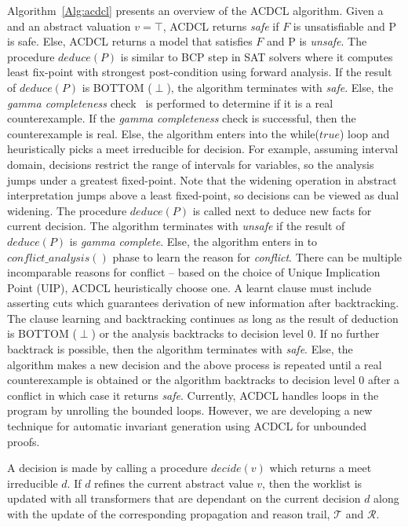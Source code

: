 Algorithm~\ref{Alg:acdcl} presents an overview of the ACDCL algorithm.
Given a  and an abstract valuation $v = \top$,  
ACDCL returns {\em safe} if $F$ is unsatisfiable and P is safe. Else, 
ACDCL returns a model that satisfies $F$ and P is {\em unsafe}.  The 
procedure $deduce(P)$ is similar to BCP step in SAT solvers where 
it computes least fix-point with strongest post-condition using 
forward analysis. If the result of $deduce(P)$ 
is BOTTOM ($\perp$), the algorithm terminates with {\em safe}. Else, the 
{\em gamma completeness} check~\cite{sas01} is performed to determine if it is a 
real counterexample. If the {\em gamma completeness} check is successful, then the 
counterexample is real. Else, the algorithm enters into the while($true$)
loop and heuristically picks a meet irreducible for decision. For example, assuming 
interval domain, decisions restrict the range of intervals for variables, so the analysis jumps under a 
greatest fixed-point. Note that the widening operation in abstract interpretation 
jumps above a least fixed-point, so decisions can be viewed as 
dual widening. The procedure $deduce(P)$ is called next to deduce new facts for 
current decision. The algorithm terminates with {\em unsafe} if the result of $deduce(P)$ 
is {\em gamma complete}. Else, the algorithm enters in to $conflict\_analysis()$ phase to learn 
the reason for {\em conflict}. There can be multiple incomparable reasons for conflict --
based on the choice of Unique Implication Point (UIP), ACDCL heuristically choose one. 
A learnt clause must include asserting cuts which guarantees
derivation of new information after backtracking. The clause learning and backtracking continues 
as long as the result of deduction is BOTTOM ($\perp$) or the 
analysis backtracks to decision level 0. If no further backtrack is possible, then the 
algorithm terminates with {\em safe}. Else, the algorithm makes a new decision and 
the above process is repeated until a real counterexample is obtained or the algorithm 
backtracks to decision level 0 after a conflict in which case it returns {\em safe}. 
Currently, ACDCL handles loops in the program by unrolling the bounded loops. 
However, we are developing a new technique for automatic invariant generation using 
ACDCL for unbounded proofs. 


A decision is made by calling a procedure $decide(v)$ which 
returns a meet irreducible $d$.  If $d$ refines the 
current abstract value $v$, then the worklist is updated with 
all transformers that are dependant on the current decision 
$d$ along with the update of the corresponding propagation 
and reason trail, $\mathcal{T}$ and $\mathcal{R}$. 
